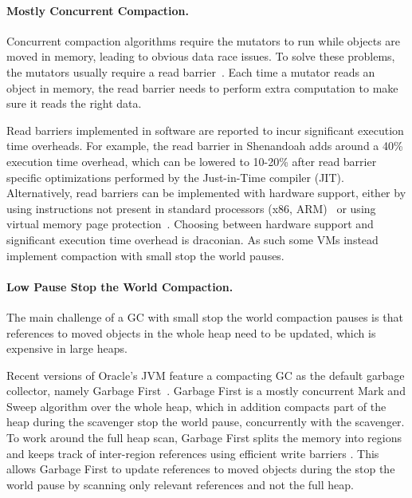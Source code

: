 \documentclass[sigplan,10pt,review,anonymous]{acmart}\settopmatter{printfolios=true,printccs=false,printacmref=false}
\begin{document}
\paragraph{Mostly Concurrent Compaction.} Concurrent compaction algorithms require the mutators to run while objects are moved in memory, leading to obvious data race issues. To solve these problems, the mutators usually require a read barrier~\cite{AzulVirtualMemConcCompact,IBMConcCompact,AzulHardwareReadBarrierConcCompact,Shenandoah,MetronomeIBMGC,RTConcCompactGC,RTGCBrooksReadBarrier}.
Each time a mutator reads an object in memory, the read barrier needs to perform extra computation to make sure it reads the right data. 

Read barriers implemented in software are reported to incur significant execution time overheads. For example, the read barrier in Shenandoah \cite{Shenandoah} adds around a 40\% execution time overhead, which can be lowered to 10-20\% after read barrier specific optimizations performed by the Just-in-Time compiler (JIT). Alternatively, read barriers can be implemented with hardware support, either by using instructions not present in standard processors (x86, ARM)~\cite{IBMConcCompact,AzulHardwareReadBarrierConcCompact,AzulSTMConcCompact} or using virtual memory page protection~\cite{AzulVirtualMemConcCompact,CompressorVirtualMemConcCompact}. 
Choosing between hardware support and significant execution time overhead is draconian. As such some VMs instead implement compaction with small stop the world pauses.

\paragraph{Low Pause Stop the World Compaction.}
The main challenge of a GC with small stop the world compaction pauses is that 
references to moved objects in the whole heap need to be updated, which is expensive in large heaps. 

Recent versions of Oracle's JVM feature a compacting GC as the default garbage collector, namely Garbage First~\cite{G1}. Garbage First is a mostly concurrent Mark and Sweep algorithm over the whole heap, which in addition compacts part of the heap during the scavenger stop the world pause, concurrently with the scavenger. To work around the full heap scan, Garbage First splits the memory into regions and keeps track of inter-region references using efficient write barriers \cite{BarriersFriendFoe}. This allows Garbage First to update references to moved objects during the stop the world pause by scanning only relevant references and not the full heap.
\end{document}
